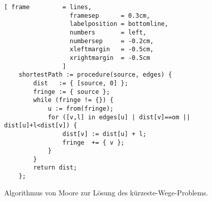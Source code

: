 \begin{figure}[!ht]
  \centering
\begin{Verbatim}[ frame         = lines, 
                  framesep      = 0.3cm, 
                  labelposition = bottomline,
                  numbers       = left,
                  numbersep     = -0.2cm,
                  xleftmargin   = -0.5cm,
                  xrightmargin  = -0.5cm
                ]
    shortestPath := procedure(source, edges) {
        dist   := { [source, 0] };
        fringe := { source };
        while (fringe != {}) {
            u := from(fringe);
            for ([v,l] in edges[u] | dist[v]==om || dist[u]+l<dist[v]) {
                dist[v] := dist[u] + l;
                fringe  += { v };
            }
        }
        return dist;
    };
\end{Verbatim}
\vspace*{-0.3cm}
  \caption{Algorithmus von Moore zur L\"osung des k\"urzeste-Wege-Problems.}
  \label{fig:moore.stlx}
\end{figure} 

